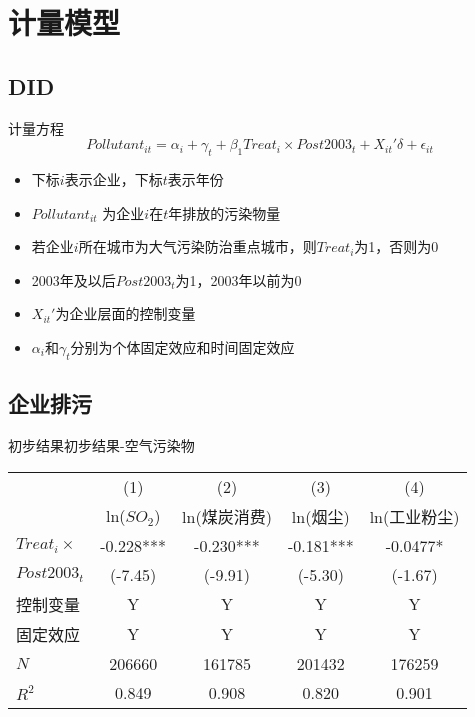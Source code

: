 \documentclass[11pt,compress,xcolor=x11names,UTF8]{beamer}
\begin{document}
\section{计量模型}

\subsection{DID}
	\begin{frame}{计量方程}
	\begin{equation}
		Pollutant_{it} =\alpha_{i} + \gamma_{t} + \beta_1  Treat_{i} \times Post2003_{t} + X _{it}'\delta  + \epsilon_{it}
	\end{equation}
	\begin{itemize}
		\item 下标$i$表示企业，下标$t$表示年份
		\item $Pollutant_{it}$ 为企业$i$在$t$年排放的污染物量
		\item 若企业$i$所在城市为大气污染防治重点城市，则$Treat_{i} $为1，否则为0
		\item 2003年及以后$Post2003_{t}$为1，2003年以前为0
		\item $X _{it}'$为企业层面的控制变量
		\item $\alpha_{i} $和$ \gamma_{t} $分别为个体固定效应和时间固定效应
	\end{itemize}

	\end{frame}

\subsection{企业排污}
\begin{frame}{初步结果}{初步结果-空气污染物}

	
	\begin{tabular}{l*{4}{c}}
		\hline\hline
		&\multicolumn{1}{c}{(1)}&\multicolumn{1}{c}{(2)}&\multicolumn{1}{c}{(3)}&\multicolumn{1}{c}{(4)}\\
		&\multicolumn{1}{c}{ln($SO_2$)}&\multicolumn{1}{c}{ln(煤炭消费)}&\multicolumn{1}{c}{ln(烟尘)}&\multicolumn{1}{c}{ln(工业粉尘)}\\
		\hline
		$Treat_{i} \times$      &   -0.228***&   -0.230***&   -0.181***&  -0.0477*  \\
		 $Post2003_{t}$ &  (-7.45)   &  (-9.91)   &  (-5.30)   &  (-1.67)   \\
		\hline
		控制变量       &   Y&   Y&   Y&  Y \\
        固定效应                 & Y  & Y   &  Y   &  Y  \\
       
		\hline
		\(N\)     &   206660   &   161785   &   201432   &   176259   \\
		\(R^{2}\) &    0.849   &    0.908   &    0.820   &    0.901   \\
		\hline\hline
	\end{tabular}
	
\end{frame}
\end{document}
